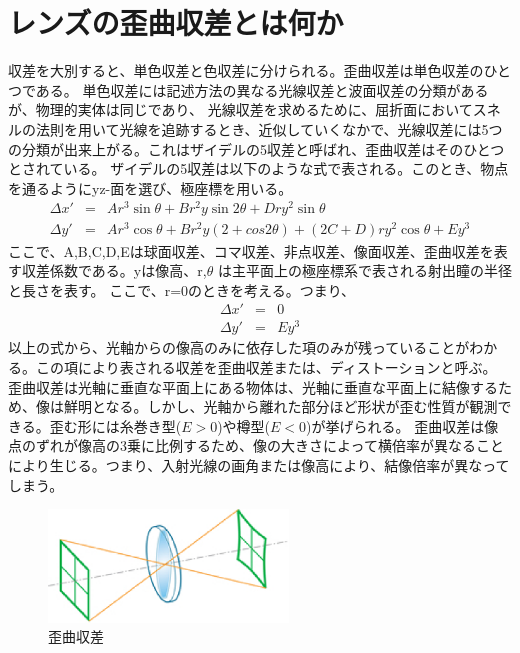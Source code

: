 \section{レンズの歪曲収差とは何か}
収差を大別すると、単色収差と色収差に分けられる。歪曲収差は単色収差のひとつである。
単色収差には記述方法の異なる光線収差と波面収差の分類があるが、物理的実体は同じであり、
光線収差を求めるために、屈折面においてスネルの法則を用いて光線を追跡するとき、近似していくなかで、光線収差には5つの分類が出来上がる。これはザイデルの5収差と呼ばれ、歪曲収差はそのひとつとされている。
ザイデルの5収差は以下のような式で表される。このとき、物点を通るようにyz-面を選び、極座標を用いる。
\begin{eqnarray}
	\Delta x' & = & A r^3 \sin \theta + B r^2 y \sin 2\theta + D r y^2 \sin \theta \\
	\Delta y' & = & A r^3 \cos \theta + B r^2 y (2+cos2\theta) + (2C+D)r y^2 \cos \theta + E y^3
\end{eqnarray}
ここで、A,B,C,D,Eは球面収差、コマ収差、非点収差、像面収差、歪曲収差を表す収差係数である。yは像高、r,\begin{math} \theta \end{math} は主平面上の極座標系で表される射出瞳の半径と長さを表す。
ここで、r=0のときを考える。つまり、
\begin{eqnarray}
	\Delta x' & = & 0\\
	\Delta y' & = & E y^3
\end{eqnarray}
以上の式から、光軸からの像高のみに依存した項のみが残っていることがわかる。この項により表される収差を歪曲収差または、ディストーションと呼ぶ。
歪曲収差は光軸に垂直な平面上にある物体は、光軸に垂直な平面上に結像するため、像は鮮明となる。しかし、光軸から離れた部分ほど形状が歪む性質が観測できる。歪む形には糸巻き型(\begin{math}E>0\end{math})や樽型(\begin{math}E<0\end{math})が挙げられる。
歪曲収差は像点のずれが像高の3乗に比例するため、像の大きさによって横倍率が異なることにより生じる。つまり、入射光線の画角または像高により、結像倍率が異なってしまう。

\begin{figure}[h]
	\centering
	\includegraphics[height=30mm]{image/dist.png.eps}
	\caption{歪曲収差\ \cite{cite1}}
	\label{caption1}
\end{figure}

